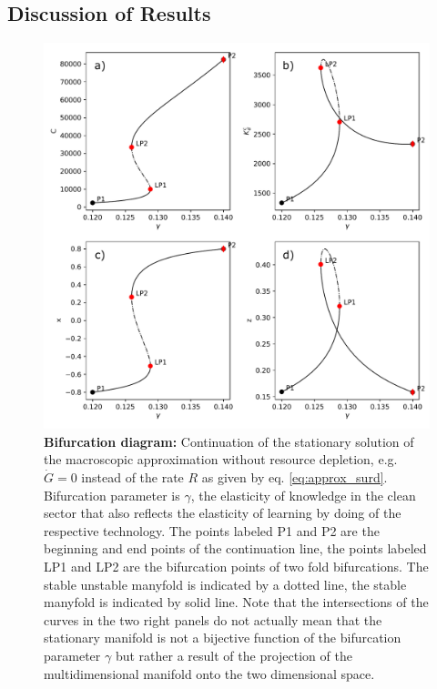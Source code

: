 \subsection{Discussion of Results}

\begin{figure}[ht!]
\centering\includegraphics[width=.95\linewidth]{figures/ba_plot.pdf}
\caption{\textbf{Bifurcation diagram:} Continuation of the stationary solution of the macroscopic approximation without resource depletion, e.g. $\dot{G} = 0$ instead of the rate $R$ as given by eq. \eqref{eq:approx_surd}. Bifurcation parameter is $\gamma$, the elasticity of knowledge in the clean sector that also reflects the elasticity of learning by doing of the respective technology. The points labeled P1 and P2 are the beginning and end points of the continuation line, the points labeled LP1 and LP2 are the bifurcation points of two fold bifurcations. The stable unstable manyfold is indicated by a dotted line, the stable manyfold is indicated by solid line. Note that the intersections of the curves in the two right panels do not actually mean that the stationary manifold is not a bijective function of the bifurcation parameter $\gamma$ but rather a result of the projection of the multidimensional manifold onto the two dimensional space.\label{fig:bifurcation_analysis}}
\end{figure}

